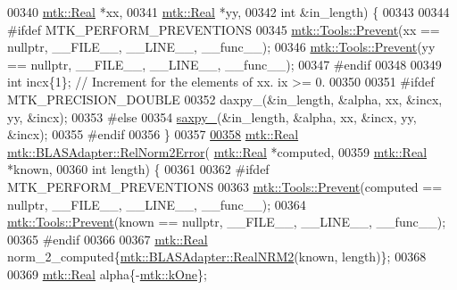 \begin{DoxyCode}
00340                                      \hyperlink{group__c01-roots_gac080bbbf5cbb5502c9f00405f894857d}{mtk::Real} *xx,
00341                                      \hyperlink{group__c01-roots_gac080bbbf5cbb5502c9f00405f894857d}{mtk::Real} *yy,
00342                                      \textcolor{keywordtype}{int} &in\_length) \{
00343 
00344 \textcolor{preprocessor}{  #ifdef MTK\_PERFORM\_PREVENTIONS}
00345   \hyperlink{classmtk_1_1Tools_a332324c6f25e66be9dff48c5987a3b9f}{mtk::Tools::Prevent}(xx == \textcolor{keyword}{nullptr}, \_\_FILE\_\_, \_\_LINE\_\_, \_\_func\_\_);
00346   \hyperlink{classmtk_1_1Tools_a332324c6f25e66be9dff48c5987a3b9f}{mtk::Tools::Prevent}(yy == \textcolor{keyword}{nullptr}, \_\_FILE\_\_, \_\_LINE\_\_, \_\_func\_\_);
00347 \textcolor{preprocessor}{  #endif}
00348 
00349   \textcolor{keywordtype}{int} incx\{1\};  \textcolor{comment}{// Increment for the elements of xx. ix >= 0.}
00350 
00351 \textcolor{preprocessor}{  #ifdef MTK\_PRECISION\_DOUBLE}
00352   daxpy\_(&in\_length, &alpha, xx, &incx, yy, &incx);
00353 \textcolor{preprocessor}{  #else}
00354   \hyperlink{namespacemtk_a81a2d7d1ea9eff65ae13646c93dad5e9}{saxpy\_}(&in\_length, &alpha, xx, &incx, yy, &incx);
00355 \textcolor{preprocessor}{  #endif}
00356 \}
00357 
\hypertarget{mtk__blas__adapter_8cc_source_l00358}{}\hyperlink{classmtk_1_1BLASAdapter_af2ac5691f45e67d6e26186b071119ec4}{00358} \hyperlink{group__c01-roots_gac080bbbf5cbb5502c9f00405f894857d}{mtk::Real} \hyperlink{classmtk_1_1BLASAdapter_af2ac5691f45e67d6e26186b071119ec4}{mtk::BLASAdapter::RelNorm2Error}(
      \hyperlink{group__c01-roots_gac080bbbf5cbb5502c9f00405f894857d}{mtk::Real} *computed,
00359                                           \hyperlink{group__c01-roots_gac080bbbf5cbb5502c9f00405f894857d}{mtk::Real} *known,
00360                                           \textcolor{keywordtype}{int} length) \{
00361 
00362 \textcolor{preprocessor}{  #ifdef MTK\_PERFORM\_PREVENTIONS}
00363   \hyperlink{classmtk_1_1Tools_a332324c6f25e66be9dff48c5987a3b9f}{mtk::Tools::Prevent}(computed == \textcolor{keyword}{nullptr}, \_\_FILE\_\_, \_\_LINE\_\_, \_\_func\_\_);
00364   \hyperlink{classmtk_1_1Tools_a332324c6f25e66be9dff48c5987a3b9f}{mtk::Tools::Prevent}(known == \textcolor{keyword}{nullptr}, \_\_FILE\_\_, \_\_LINE\_\_, \_\_func\_\_);
00365 \textcolor{preprocessor}{  #endif}
00366 
00367   \hyperlink{group__c01-roots_gac080bbbf5cbb5502c9f00405f894857d}{mtk::Real} norm\_2\_computed\{\hyperlink{classmtk_1_1BLASAdapter_ab92440888b730863244c5d9479c11aca}{mtk::BLASAdapter::RealNRM2}(known, length)\};
00368 
00369   \hyperlink{group__c01-roots_gac080bbbf5cbb5502c9f00405f894857d}{mtk::Real} alpha\{-\hyperlink{group__c01-roots_ga26407c24d43b6b95480943340d285c71}{mtk::kOne}\};

\end{DoxyCode}
